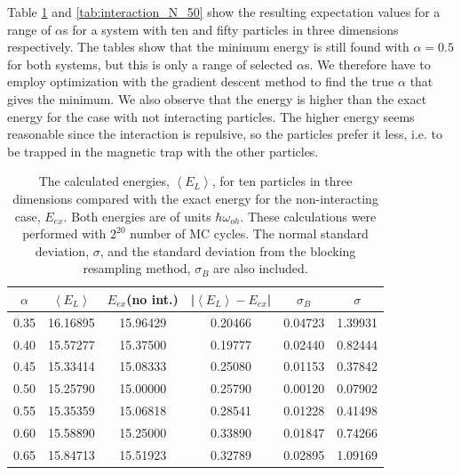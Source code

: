 Table \ref{tab:interaction_N_10} and \ref{tab:interaction_N_50} show the resulting expectation values for a range of $\alpha$s for a system with ten and fifty particles in three dimensions respectively. The tables show that the minimum energy is still found with $\alpha = 0.5$ for both systems, but this is only a range of selected $\alpha$s. We therefore have to employ optimization with the gradient descent method to find the true $\alpha$ that gives the minimum. We also observe that the energy is higher than the exact energy for the case with not interacting particles. The higher energy seems reasonable since the interaction is repulsive, so the particles prefer it less, i.e. to be trapped in the magnetic trap with the other particles.

\begin{table}[H]\caption{The calculated energies, $\left<E_L\right>$, for ten particles in three dimensions compared with the exact energy for the non-interacting case, $E_{ex}$. Both energies are of units $\hbar\omega_{oh}$. These calculations were performed with $2^{20}$ number of MC cycles. The normal standard deviation, $\sigma$, and the standard deviation from the blocking resampling method, $\sigma_B$ are also included.}\label{tab:interaction_N_10}
\center
\begin{tabular}{cccccc}
$\alpha$ & $\left< E_L \right>$ & $E_{ex}$(no int.) & |$\left< E_L \right>-E_{ex}$|  & $\sigma_B$ & $\sigma$\\ \hline
0.35 & 16.16895 & 15.96429 & 0.20466 & 0.04723 & 1.39931\\
0.40 & 15.57277 & 15.37500 & 0.19777 & 0.02440 & 0.82444\\
0.45 & 15.33414 & 15.08333 & 0.25080 & 0.01153 & 0.37842\\
0.50 & 15.25790 & 15.00000 & 0.25790 & 0.00120 & 0.07902\\
0.55 & 15.35359 & 15.06818 & 0.28541 & 0.01228 & 0.41498\\
0.60 & 15.58890 & 15.25000 & 0.33890 & 0.01847 & 0.74266\\
0.65 & 15.84713 & 15.51923 & 0.32789 & 0.02895 & 1.09169\\
\end{tabular}
\end{table} 

